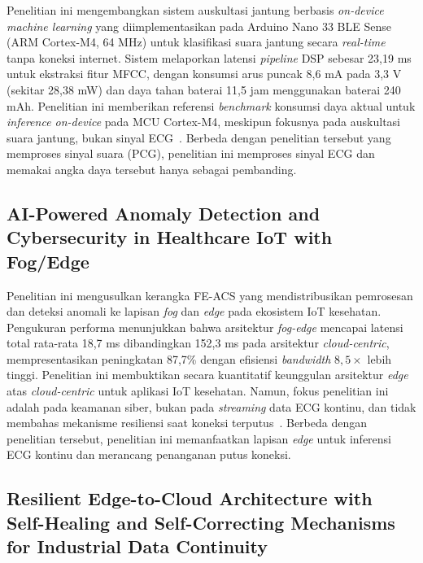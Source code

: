 Penelitian ini mengembangkan sistem auskultasi jantung berbasis \textit{on-device machine learning} yang diimplementasikan pada Arduino Nano 33 BLE Sense (ARM Cortex-M4, 64 MHz) untuk klasifikasi suara jantung secara \textit{real-time} tanpa koneksi internet. Sistem melaporkan latensi \textit{pipeline} DSP sebesar 23,19 ms untuk ekstraksi fitur MFCC, dengan konsumsi arus puncak 8,6 mA pada 3,3 V (sekitar 28,38 mW) dan daya tahan baterai 11,5 jam menggunakan baterai 240 mAh. Penelitian ini memberikan referensi \textit{benchmark} konsumsi daya aktual untuk \textit{inference on-device} pada MCU Cortex-M4, meskipun fokusnya pada auskultasi suara jantung, bukan sinyal ECG~\cite{chowdhury_2023}. Berbeda dengan penelitian tersebut yang memproses sinyal suara (PCG), penelitian ini memproses sinyal ECG dan memakai angka daya tersebut hanya sebagai pembanding.

\subsection{AI-Powered Anomaly Detection and Cybersecurity in Healthcare IoT with Fog/Edge}
\label{subsec:related-alquayed2026}

Penelitian ini mengusulkan kerangka FE-ACS yang mendistribusikan pemrosesan dan deteksi anomali ke lapisan \textit{fog} dan \textit{edge} pada ekosistem IoT kesehatan. Pengukuran performa menunjukkan bahwa arsitektur \textit{fog-edge} mencapai latensi total rata-rata 18,7 ms dibandingkan 152,3 ms pada arsitektur \textit{cloud-centric}, mempresentasikan peningkatan 87,7\% dengan efisiensi \textit{bandwidth} $8{,}5\times$ lebih tinggi. Penelitian ini membuktikan secara kuantitatif keunggulan arsitektur \textit{edge} atas \textit{cloud-centric} untuk aplikasi IoT kesehatan. Namun, fokus penelitian ini adalah pada keamanan siber, bukan pada \textit{streaming} data ECG kontinu, dan tidak membahas mekanisme resiliensi saat koneksi terputus~\cite{al_quayed_2026}. Berbeda dengan penelitian tersebut, penelitian ini memanfaatkan lapisan \textit{edge} untuk inferensi ECG kontinu dan merancang penanganan putus koneksi.

\subsection{Resilient Edge-to-Cloud Architecture with Self-Healing and Self-Correcting Mechanisms for Industrial Data Continuity}
\label{subsec:related-boluda2026}


